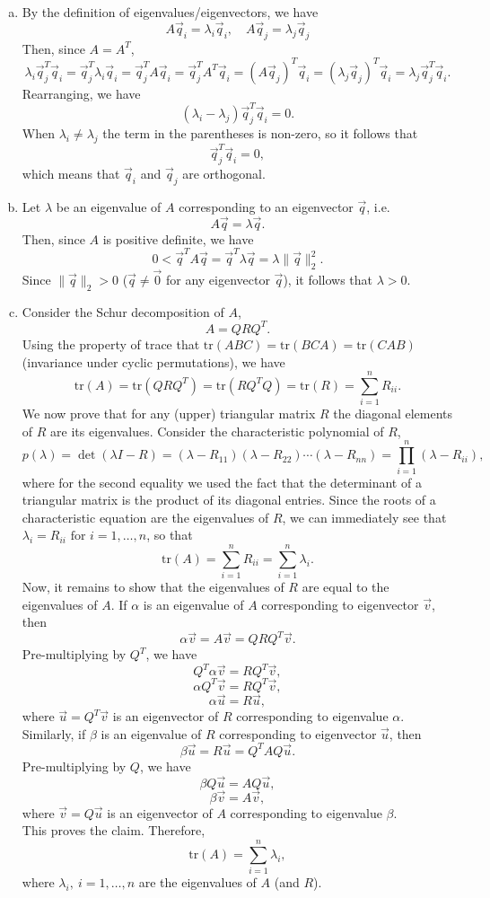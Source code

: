 \documentclass{article}
\newcommand{\al}{\alpha}
\newcommand{\la}{\lambda}
\newcommand{\normII}[1]{\|#1\|_2}
\newcommand{\tr}{\mathrm{tr}}
\newcommand{\tfor}{\text{ for }}
\begin{document}
\begin{enumerate}[(a)]
\item By the definition of eigenvalues/eigenvectors, we have
\[ A\vec q_i = \la_i \vec q_i, \quad A\vec q_j = \la_j \vec q_j \]
Then, since $A = A^T$, 
\[ \la_i \vec q_j^T \vec q_i = \vec q_j^T \la_i \vec q_i = \vec q_j^T A \vec q_i = \vec q_j^T A^T \vec q_i = (A \vec q_j)^T \vec q_i = (\la_j \vec q_j)^T \vec q_i = \la_j \vec q_j^T \vec q_i. \]
Rearranging, we have
\[ (\la_i - \la_j) \vec q_j^T \vec q_i = 0. \]
When $\la_i \ne \la_j$ the term in the parentheses is non-zero, so it follows that
\[ \vec q_j^T \vec q_i = 0, \]
which means that $\vec q_i$ and $\vec q_j$ are orthogonal.

\item Let $\la$ be an eigenvalue of $A$ corresponding to an eigenvector $\vec q$, i.e.
\[ A\vec q = \la \vec q. \]
Then, since $A$ is positive definite, we have
\[ 0 < \vec q^T A \vec q = \vec q^T \la \vec q = \la \normII{\vec q}^2. \]
Since $\normII{\vec q} > 0$ ($\vec q \ne \vec 0$ for any eigenvector $\vec q$), it follows that $\la>0$.

\item Consider the Schur decomposition of $A$,
\[ A = QRQ^T. \]
Using the property of trace that $\tr(ABC) = \tr(BCA) = \tr(CAB)$ (invariance under cyclic permutations), we have
\[ \tr(A) = \tr(QRQ^T) = \tr(RQ^TQ) = \tr(R) = \sum_{i=1}^n R_{ii}. \]
We now prove that for any (upper) triangular matrix $R$ the diagonal elements of $R$ are its eigenvalues. Consider the characteristic polynomial of $R$,
\[ p(\la) = \det(\la I - R) = (\la-R_{11})(\la-R_{22})\cdots(\la-R_{nn}) = \prod_{i=1}^n (\la-R_{ii}), \]
where for the second equality we used the fact that the determinant of a triangular matrix is the product of its diagonal entries.
Since the roots of a characteristic equation are the eigenvalues of $R$, we can immediately see that $\la_i = R_{ii}\tfor i=1,\dots, n$, so that
\[ \tr(A) = \sum_{i=1}^n R_{ii} = \sum_{i=1}^n \la_i. \]
Now, it remains to show that the eigenvalues of $R$ are equal to the eigenvalues of $A$.
If $\al$ is an eigenvalue of $A$ corresponding to eigenvector $\vec v$, then
\[ \al \vec v = A \vec v = QRQ^T \vec v. \]
Pre-multiplying by $Q^T$, we have
\[ Q^T \al \vec v = RQ^T \vec v, \]
\[ \al Q^T \vec v = RQ^T \vec v, \]
\[ \al \vec u = R \vec u, \]
where $\vec u = Q^T \vec v$ is an eigenvector of $R$ corresponding to eigenvalue $\al$.\\ 
Similarly, if $\beta$ is an eigenvalue of $R$ corresponding to eigenvector $\vec u$, then
\[ \beta \vec u = R \vec u = Q^TAQ \vec u. \]
Pre-multiplying by $Q$, we have
\[ \beta Q \vec u = AQ \vec u, \]
\[ \beta \vec v = A \vec v, \]
where $\vec v = Q \vec u$ is an eigenvector of $A$ corresponding to eigenvalue $\beta$.\\
This proves the claim. Therefore,
\[ \tr(A) = \sum_{i=1}^n \la_i, \]
where $\la_i,\ i=1,\dots, n$ are the eigenvalues of $A$ (and $R$).


\end{enumerate}
\end{document}
